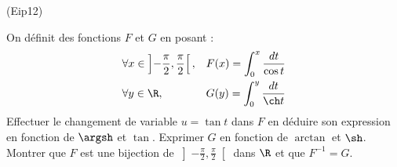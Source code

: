 \begin{tiny}(Eip12)\end{tiny}
On définit des fonctions $F$ et $G$ en posant :
\begin{align*}
&\forall x \in \left] -\frac{\pi }{2}, \frac{\pi }{2}\right[,& 
F(x)=\int_{0}^{x}\frac{dt}{\cos t} \\
&\forall y \in \R,&  G(y)=\int_{0}^{y}\frac{dt}{\ch t}
\end{align*}
Effectuer le changement de variable $u=\tan t$ dans  $F$ en déduire son expression en fonction de $\argsh$ et $\tan $. Exprimer $G$ en fonction de $\arctan $ et $\sh $. Montrer que $F$ est une bijection de $\left]-\frac{\pi}{2},\frac{\pi}{2}\right[$ dans $\R$ et que $F^{-1}=G$.